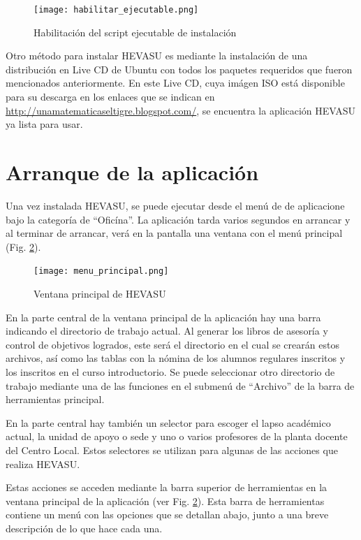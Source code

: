 \documentclass[letterpaper,12pt]{book}
\begin{document}
\begin{figure}[!ht]
	\centering
	\texttt{[image: habilitar\_ejecutable.png]}
	\caption{Habilitación del script ejecutable de instalación}
	\label{fig:scriptinstalacion}
\end{figure}

Otro método para instalar HEVASU es mediante la instalación de una distribución en Live CD de Ubuntu con todos los paquetes requeridos que fueron mencionados anteriormente. En este Live CD, cuya imágen ISO está disponible para su descarga en los enlaces que se indican en \url{http://unamatematicaseltigre.blogspot.com/}, se encuentra la aplicación HEVASU ya lista para usar.

\section{Arranque de la aplicación}

Una vez instalada HEVASU, se puede ejecutar desde el menú de de aplicacione bajo la categoría de ``Oficína''. La aplicación tarda varios segundos en arrancar y al terminar de arrancar, verá en la pantalla una ventana con el menú principal (Fig. \ref{fig:menuprincipal}).

\begin{figure}[!ht]
	\centering
	\texttt{[image: menu\_principal.png]}
	\caption{Ventana principal de HEVASU}
	\label{fig:menuprincipal}
\end{figure}

En la parte central de la ventana principal de la aplicación hay una barra indicando el directorio de trabajo actual. Al generar los libros de asesoría y control de objetivos logrados, este será el directorio en el cual se crearán estos archivos, así como las tablas con la nómina de los alumnos regulares inscritos y los inscritos en el curso introductorio. Se puede seleccionar otro directorio de trabajo mediante una de las funciones en el submenú de ``Archivo'' de la barra de herramientas principal.

En la parte central hay también un selector para escoger el lapso académico actual, la unidad de apoyo o sede y uno o varios profesores de la planta docente del Centro Local. Estos selectores se utilizan para algunas de las acciones que realiza HEVASU\label{sec:selectores_principales}.

Estas acciones se acceden mediante la barra superior de herramientas en la ventana principal de la aplicación (ver Fig. \ref{fig:menuprincipal}). Esta barra de herramientas contiene un menú con las opciones que se detallan abajo, junto a una breve descripción de lo que hace cada una.
\end{document}
